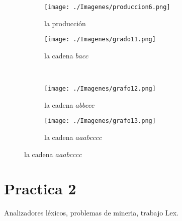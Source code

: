 \documentclass{article}
\begin{document}
\begin{flushleft}
\begin{enumerate}
                \begin{figure}[h] 
                    \centering
                    \begin{subfigure}[b]{0.45\textwidth}
                        \centering
                        \texttt{[image: ./Imagenes/produccion6.png]}
                        \caption{la producción}
                        \label{fig:label22}
                    \end{subfigure}
                    \hfill
                    \begin{subfigure}[b]{0.45\textwidth}
                        \centering
                        \texttt{[image: ./Imagenes/grado11.png]}
                        \caption{la cadena $bacc$}
                        \label{fig:label23}
                    \end{subfigure}
                    \vspace{0.5cm} 
                    \\
                    \begin{subfigure}[b]{0.45\textwidth}
                        \centering
                        \texttt{[image: ./Imagenes/grafo12.png]}
                        \caption{la cadena $abbccc$}
                        \label{fig:label24}
                    \end{subfigure}
                    \hfill
                    \begin{subfigure}[b]{0.45\textwidth}
                        \centering
                        \texttt{[image: ./Imagenes/grafo13.png]}
                        \caption{la cadena $aaabcccc$}
                        \label{fig:label25}
                    \end{subfigure}
                    \label{fig:matrix6}
                \end{figure}


            \end{enumerate}
        \end{flushleft}


        \newpage


        \section{Practica 2}
        Analizadores léxicos, problemas de mineria, trabajo Lex.
\end{document}
